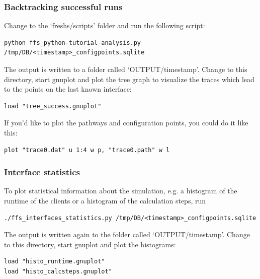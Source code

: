 \documentclass[a4paper,oneside]{article}
\newenvironment{mylisting}
{\begin{list}{}{\setlength{\leftmargin}{1em}}\item\scriptsize\bfseries}
{\end{list}}
\begin{document}
\subsubsection{Backtracking successful runs}
Change to the `freshs/scripts' folder and run the following script:
\begin{mylisting}
\begin{verbatim}
python ffs_python-tutorial-analysis.py /tmp/DB/<timestamp>_configpoints.sqlite
\end{verbatim}
\end{mylisting}
The output is written to a folder called `OUTPUT/timestamp'. Change to this directory, start gnuplot and plot the tree graph to visualize the traces which lead to the points on the last known interface:
\begin{mylisting}
\begin{verbatim}
load "tree_success.gnuplot"
\end{verbatim}
\end{mylisting}
If you'd like to plot the pathways and configuration points, you could do it like this:
\begin{mylisting}
\begin{verbatim}
plot "trace0.dat" u 1:4 w p, "trace0.path" w l
\end{verbatim}
\end{mylisting}


\subsubsection{Interface statistics}
To plot statistical information about the simulation, e.g. a histogram of the runtime of the clients or a histogram of the calculation steps, run
\begin{mylisting}
\begin{verbatim}
./ffs_interfaces_statistics.py /tmp/DB/<timestamp>_configpoints.sqlite
\end{verbatim}
\end{mylisting}
The output is written again to the folder called `OUTPUT/timestamp'. Change to this directory, start gnuplot and plot the histograms:
\begin{mylisting}
\begin{verbatim}
load "histo_runtime.gnuplot"
load "histo_calcsteps.gnuplot"
\end{verbatim}
\end{mylisting}
\end{document}
